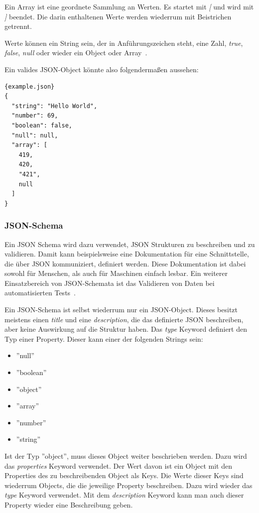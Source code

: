  Ein Array ist eine geordnete Sammlung an Werten.
 Es startet mit \textit{[} und wird mit \textit{]} beendet.
 Die darin enthaltenen Werte werden wiederrum mit Beistrichen getrennt.

 Werte können ein String sein, der in Anführungszeichen steht, eine Zahl, \textit{true}, \textit{false}, \textit{null}
 oder wieder ein Object oder Array~\cite{json}.

 Ein valides JSON-Object könnte also folgendermaßen aussehen:

 \label{json-example}
 \begin{lstlisting}[label={lst:example.jsom}]{example.json}
{
  "string": "Hello World",
  "number": 69,
  "boolean": false,
  "null": null,
  "array": [
    419,
    420,
    "421",
    null
  ]
}
 \end{lstlisting}

 \subsubsection{JSON-Schema}
Ein JSON Schema wird dazu verwendet, JSON Strukturen zu beschreiben und zu validieren.
Damit kann beispielsweise eine Dokumentation für eine Schnittstelle, die über JSON kommuniziert, definiert werden.
Diese Dokumentation ist dabei sowohl für Menschen, als auch für Maschinen einfach lesbar.
Ein weiterer Einsatzbereich von JSON-Schemata ist das Validieren von Daten bei automatisierten Tests~\cite{json-schema}.

 Ein JSON-Schema ist selbst wiederrum nur ein JSON-Object.
 Dieses besitzt meistens einen \textit{title} und eine \textit{description}, die das definierte JSON beschreiben,
 aber keine Auswirkung auf die Struktur haben.
 Das \textit{type} Keyword definiert den Typ einer Property.
 Dieser kann einer der folgenden Strings sein:

\begin{itemize}
  \item ''null''
  \item ''boolean''
  \item ''object''
  \item ''array''
  \item ''number''
  \item ''string''
\end{itemize}

 Ist der Typ ''object'', muss dieses Object weiter beschrieben werden.
 Dazu wird das \textit{properties} Keyword verwendet.
 Der Wert davon ist ein Object mit den Properties des zu beschreibenden Object als Keys.
 Die Werte dieser Keys sind wiederrum Objects, die die jeweilige Property beschreiben.
 Dazu wird wieder das \textit{type} Keyword verwendet.
 Mit dem \textit{description} Keyword kann man auch dieser Property wieder eine Beschreibung geben.

